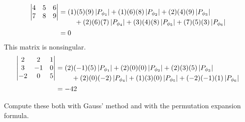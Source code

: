 \begin{exercises}
\begin{answer}
\begin{exparts}
\begin{align*}
\begin{vmatrix}
              4  &5  &6  \\
              7  &8  &9
            \end{vmatrix}
            &=
            \begin{aligned}[t]
              &(1)(5)(9)\deter{P_{\phi_1}}
              +(1)(6)(8)\deter{P_{\phi_2}}
              +(2)(4)(9)\deter{P_{\phi_3}}  \\
              &\hbox{}\quad\hbox{}
              +(2)(6)(7)\deter{P_{\phi_4}}
              +(3)(4)(8)\deter{P_{\phi_5}}
              +(7)(5)(3)\deter{P_{\phi_6}}
            \end{aligned}                        \\
            &=0
          \end{align*}
        \partsitem This matrix is nonsingular. 
          \begin{align*}
            \begin{vmatrix}
              2  &2  &1  \\
              3  &-1 &0  \\
              -2 &0  &5
            \end{vmatrix}
            &=
            \begin{aligned}[t]
              &(2)(-1)(5)\deter{P_{\phi_1}}
              +(2)(0)(0)\deter{P_{\phi_2}}
              +(2)(3)(5)\deter{P_{\phi_3}} \\
              &\hbox{}\quad\hbox{} 
              +(2)(0)(-2)\deter{P_{\phi_4}}
              +(1)(3)(0)\deter{P_{\phi_5}}
              +(-2)(-1)(1)\deter{P_{\phi_6}}
            \end{aligned}                      \\
            &=-42
        \end{align*}
      \end{exparts}
    \end{answer}
  \recommended \item
    Compute these both with Gauss' method and with the permutation
    expansion formula.
\end{exercises}
